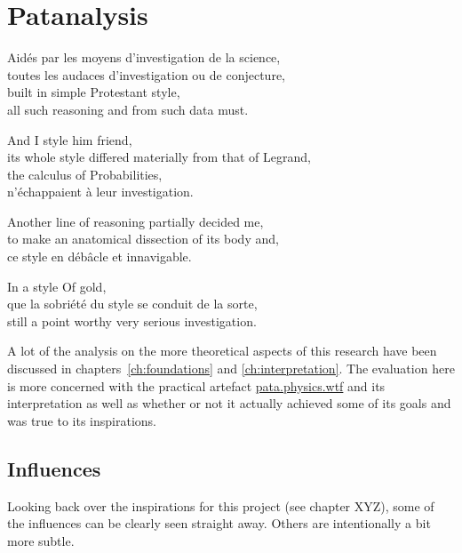 
\chapter{Patanalysis}
\label{ch:analysis}

\startcontents[chapters]

\vfill

Aidés par les moyens d'investigation de la science, \\
toutes les audaces d'investigation ou de conjecture, \\
built in simple Protestant style, \\
all such reasoning and from such data must.

And I style him friend, \\
its whole style differed materially from that of Legrand, \\
the calculus of Probabilities, \\
n'échappaient à leur investigation.

Another line of reasoning partially decided me, \\
to make an anatomical dissection of its body and, \\
ce style en débâcle et innavigable.

In a style Of gold, \\
que la sobriété du style se conduit de la sorte, \\
still a point worthy very serious investigation.

\newpage
\minicontents
\spirals



A lot of the analysis on the more theoretical aspects of this research have been discussed in chapters~\ref{ch:foundations} and \ref{ch:interpretation}. The evaluation here is more concerned with the practical artefact \url{pata.physics.wtf} and its interpretation as well as whether or not it actually achieved some of its goals and was true to its inspirations.

\section{Influences}

Looking back over the inspirations for this project (see chapter XYZ), some of the influences can be clearly seen straight away. Others are intentionally a bit more subtle.


